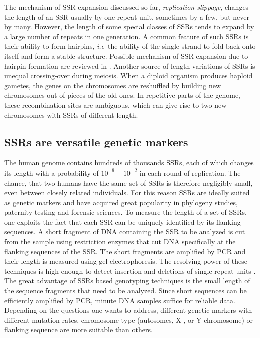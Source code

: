 The mechanism of SSR expansion discussed so far, \emph{replication slippage}, 
changes the length of an SSR usually by one repeat unit, sometimes by a few, but never by many.
However, the length of some special classes of SSRs tends to expand by a large number
of repeats in one generation. A common feature of such SSRs is their ability to form hairpins, 
\emph{i.e}~the ability of the single strand to fold back onto itself and form a stable structure.
Possible mechanism of SSR expansion due to hairpin formation are reviewed in 
\cite{Lenzmeier_CytoGenRes_03, Bzymek_PNAS_01}. Another source of length variations
of SSRs is unequal crossing-over during meiosis. When a diploid organism produces
haploid gametes, the genes on the chromosomes are reshuffled by building new chromosomes
out of pieces of the old ones. In repetitive parts of the genome, these recombination sites are 
ambiguous, which can give rise to two new chromosomes with SSRs of different length.


\subsection{SSRs are versatile genetic markers}
The human genome contains hundreds of thousands SSRs, each of which changes its length
with a probability of $10^{-6}-10^{-2}$ in each round of replication. The chance, that two humans
have the same set of SSRs is therefore negligibly small, even between closely related individuals. 
For this reason SSRs are ideally suited as genetic markers and have acquired great popularity
in phylogeny studies, paternity testing and forensic sciences. 
To measure the length of a set of SSRs, one exploits the fact that each SSR can be uniquely 
identified by its flanking sequences. A short fragment of DNA containing the SSR to be analyzed 
is cut from the sample using restriction enzymes that cut DNA specifically at the flanking sequences 
of the SSR. The short fragments are amplified by PCR and their length is measured using
gel electrophoresis. The resolving power of these
techniques is high enough to detect insertion and deletions of single repeat units \cite{Bennett_MolPath_00}. 
The great advantage of SSRs based genotyping techniques is the small length of the sequence 
fragments that need to be analyzed. Since short sequences can be efficiently amplified by PCR, 
minute DNA samples suffice for reliable data. 
Depending on the questions one wants to address, different genetic markers with different mutation
rates, chromosome type (autosomes, X-, or Y-chromosome) or flanking sequence are more 
suitable than others. 

